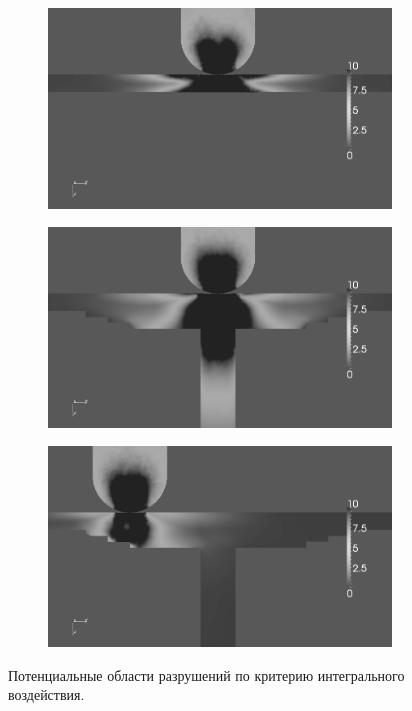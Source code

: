 \begin{figure}[htp]
\centering
\begin{subfigure}[b]{0.3\textwidth}
\center
\includegraphics[width=\textwidth]{png/pkm-experiment/wing-only/sum-bw.png}
\end{subfigure}
\begin{subfigure}[b]{0.3\textwidth}
\center
\includegraphics[width=\textwidth]{png/pkm-experiment/wing-stringer/sum-bw.png}
\end{subfigure}
\begin{subfigure}[b]{0.3\textwidth}
\center
\includegraphics[width=\textwidth]{png/pkm-experiment/wing-stringer-non-center/sum-bw.png}
\end{subfigure}
\caption{Потенциальные области разрушений по критерию интегрального воздействия.}
\label{pic:pkm_experiment_compare_integral}
\end{figure}

